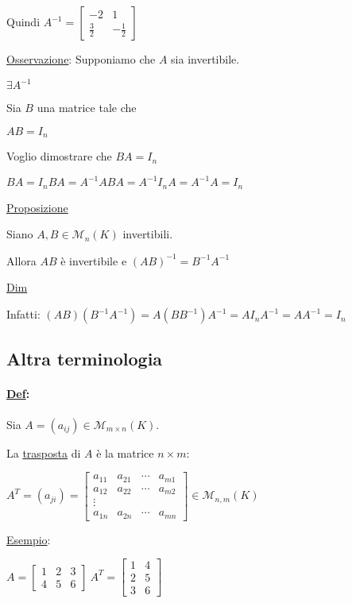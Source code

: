 \documentclass{article}
\newcommand{\ul}[1]{\underline{#1}}
\newcommand{\M}{\mathcal{M}}
\newcommand{\Def}[2]{\paragraph{\ul{Def}:}#1\\\hspace*{3em}\begin{minipage}{.8\textwidth}#2\end{minipage}}
\begin{document}
\begin{enumerate}
	      Quindi $A^{-1}=\begin{bmatrix}-2&1\\\frac{3}{2}&-\frac{1}{2}\end{bmatrix}$

	      \ul{Osservazione}: Supponiamo che $A$ sia invertibile.

	      $\exists A^{-1}$

	      Sia $B$ una matrice tale che

	      $AB=I_n$

	      Voglio dimostrare che $BA=I_n$

	      $BA=I_nBA=A^{-1}ABA=A^{-1}I_nA=A^{-1}A=I_n$
\end{enumerate}

\ul{Proposizione}

Siano $A,B\in\M_n(K)$ invertibili.

Allora $AB$ è invertibile e $(AB)^{-1}=B^{-1}A^{-1}$

\ul{Dim}

Infatti: $(AB)(B^{-1}A^{-1})=A(BB^{-1})A^{-1}=AI_nA^{-1}=AA^{-1}=I_n$

\subsection{Altra terminologia}
\Def{Sia $A=(a_{ij})\in\M_{m\times n}(K)$.}{
	La \ul{trasposta} di $A$ è la matrice $n\times m$:

	$A^T=(a_{ji})=\begin{bmatrix}
			a_{11} & a_{21} & \cdots & a_{m1} \\
			a_{12} & a_{22} & \cdots & a_{m2} \\
			\vdots                            \\
			a_{1n} & a_{2n} & \cdots & a_{mn}
		\end{bmatrix}\in\M_{n,m}(K)$

	\ul{Esempio}:

	$A=\begin{bmatrix}
			1 & 2 & 3 \\4&5&6
		\end{bmatrix}\ A^T=\begin{bmatrix}
			1 & 4 \\2&5\\3&6
		\end{bmatrix}$
}
\end{document}
